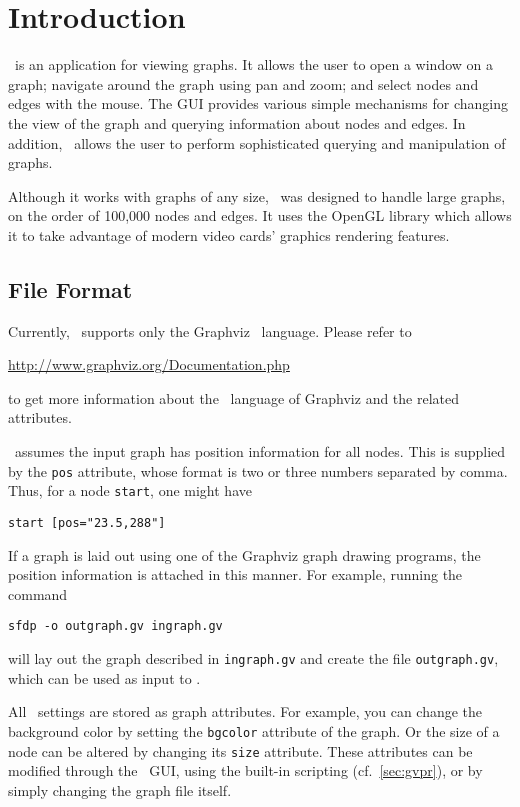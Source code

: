 \section{Introduction}
\label{sec:intro}

\smyrna\ is an application for viewing graphs. It allows the user
to open a window on a graph; navigate around the graph using pan
and zoom; and select nodes and edges with the mouse. The GUI provides various simple
mechanisms for changing the view of the graph and querying information about nodes and edges. 
In addition, \smyrna\
allows the user to perform sophisticated querying and
manipulation of graphs.

Although it works with graphs of any size, \smyrna\ was 
designed to handle large graphs, on the order of 100,000 nodes
and edges. It uses the OpenGL library which allows it to take advantage 
of modern video cards' graphics rendering features. 

\subsection{File Format} 
\label{sec:files}
Currently, \smyrna\ supports only the Graphviz \DOT\ language.
Please refer to 
\begin{center}
\url{http://www.graphviz.org/Documentation.php} 
\end{center}
to get more information about the \DOT\ language of Graphviz and
the related attributes.

\smyrna\ assumes the input graph has position information
for all nodes. This is supplied by the {\tt pos} attribute, whose
format is two or three numbers separated by comma. Thus, for a
node {\tt start}, one might have
\begin{center}
{\tt start [pos="23.5,288"]}
\end{center}
If a graph is laid out using one of the Graphviz graph drawing programs,
the position information is attached in this manner. For example, running the
command
\begin{center}
{\tt sfdp -o outgraph.gv ingraph.gv}
\end{center}
will lay out the graph described in {\tt ingraph.gv} and create the file
{\tt outgraph.gv}, which can be used as input to \smyrna.

All \smyrna\ settings are stored as graph attributes.
For example, you can change the background color by setting the
{\tt bgcolor} attribute of the graph. Or the size of a 
node can be altered by changing its {\tt size} attribute. 
These attributes can be modified through the \smyrna\ GUI, 
using the built-in scripting (cf.~\ref{sec:gvpr}),
or by simply changing the graph file itself. 

